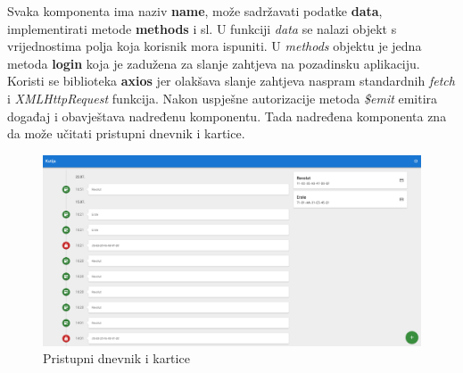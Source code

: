 Svaka komponenta ima naziv \textbf{name}, može sadržavati podatke \textbf{data}, implementirati metode \textbf{methods} i sl.
U funkciji \textit{data} se nalazi objekt s vrijednostima polja koja korisnik mora ispuniti.
U \textit{methods} objektu je jedna metoda \textbf{login} koja je zadužena za slanje zahtjeva na pozadinsku aplikaciju.
Koristi se biblioteka \textbf{axios} jer olakšava slanje zahtjeva naspram standardnih \textit{fetch} i \textit{XMLHttpRequest} funkcija.
Nakon uspješne autorizacije metoda \textit{\$emit} emitira događaj i obavještava nadređenu komponentu.
Tada nadređena komponenta zna da može učitati pristupni dnevnik i kartice.

\begin{figure}[h!]
    \centering
    \includegraphics[width=\textwidth]{images/primary-view}
    \caption{Pristupni dnevnik i kartice}
\end{figure}

